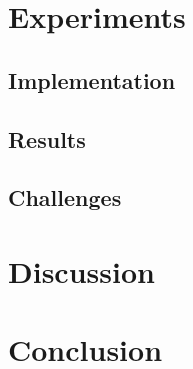 \documentclass[utf8,english]{gradu3}
\begin{document}
\chapter{Experiments}

\section{Implementation}

\section{Results}

\section{Challenges}




\chapter{Discussion}



\chapter{Conclusion}



\printbibliography
\end{document}
